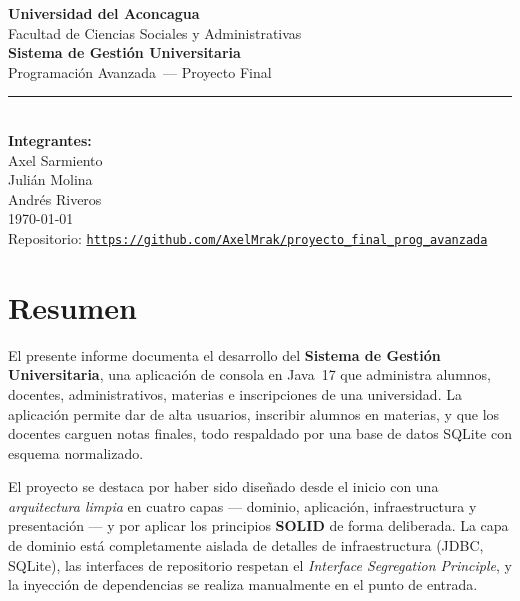 \documentclass[12pt,a4paper]{article}
\newcommand{\subject}{Programación Avanzada}
\newcommand{\titlecourse}{Sistema de Gestión Universitaria}
\newcommand{\university}{Universidad del Aconcagua}
\newcommand{\faculty}{Facultad de Ciencias Sociales y Administrativas}
\newcommand{\repourl}{https://github.com/AxelMrak/proyecto\_final\_prog\_avanzada}
\begin{document}
\begin{titlepage}
    \centering
    \vspace*{3cm}

    {\Large \textbf{\university}}\\[0.5cm]
    {\large \faculty}\\[2cm]

    {\Huge \textbf{\titlecourse}}\\[0.5cm]
    {\Large \subject\ --- Proyecto Final}\\[2cm]

    \rule{0.8\textwidth}{0.5pt}\\[0.5cm]

    {\large \textbf{Integrantes:}}\\[0.4cm]
    {\large Axel Sarmiento}\\[0.2cm]
    {\large Julián Molina}\\[0.2cm]
    {\large Andrés Riveros}\\[0.5cm]

    {\large \today}\\[0.8cm]

    {\small Repositorio: \href{\repourl}{\texttt{\repourl}}}

    \vfill
\end{titlepage}

\tableofcontents
\newpage

\section{Resumen}

El presente informe documenta el desarrollo del \textbf{Sistema de Gestión
Universitaria}, una aplicación de consola en Java~17 que administra alumnos,
docentes, administrativos, materias e inscripciones de una universidad. La
aplicación permite dar de alta usuarios, inscribir alumnos en materias, y que
los docentes carguen notas finales, todo respaldado por una base de datos
SQLite con esquema normalizado.

El proyecto se destaca por haber sido diseñado desde el inicio con una
\emph{arquitectura limpia} en cuatro capas — dominio, aplicación,
infraestructura y presentación — y por aplicar los principios \textbf{SOLID}
de forma deliberada. La capa de dominio está completamente aislada de
detalles de infraestructura (JDBC, SQLite), las interfaces de repositorio
respetan el \emph{Interface Segregation Principle}, y la inyección de
dependencias se realiza manualmente en el punto de entrada.
\end{document}
